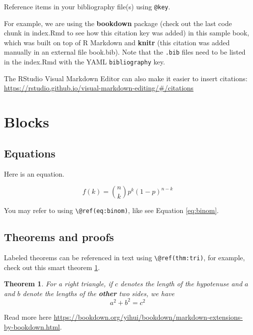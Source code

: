 \documentclass[
]{book}
\newtheorem{theorem}{Theorem}[chapter]
\theoremstyle{definition}
\theoremstyle{definition}
\theoremstyle{definition}
\theoremstyle{definition}
\theoremstyle{remark}
\begin{document}
Reference items in your bibliography file(s) using \texttt{@key}.

For example, we are using the \textbf{bookdown} package \citep{R-bookdown} (check out the last code chunk in index.Rmd to see how this citation key was added) in this sample book, which was built on top of R Markdown and \textbf{knitr} \citep{xie2015} (this citation was added manually in an external file book.bib).
Note that the \texttt{.bib} files need to be listed in the index.Rmd with the YAML \texttt{bibliography} key.

The RStudio Visual Markdown Editor can also make it easier to insert citations: \url{https://rstudio.github.io/visual-markdown-editing/\#/citations}

\hypertarget{blocks}{%
\section{Blocks}\label{blocks}}

\hypertarget{equations}{%
\subsection{Equations}\label{equations}}

Here is an equation.

\begin{equation} 
  f\left(k\right) = \binom{n}{k} p^k\left(1-p\right)^{n-k}
  \label{eq:binom}
\end{equation}

You may refer to using \texttt{\textbackslash{}@ref(eq:binom)}, like see Equation \eqref{eq:binom}.

\hypertarget{theorems-and-proofs}{%
\subsection{Theorems and proofs}\label{theorems-and-proofs}}

Labeled theorems can be referenced in text using \texttt{\textbackslash{}@ref(thm:tri)}, for example, check out this smart theorem \ref{thm:tri}.

\begin{theorem}
\protect\hypertarget{thm:tri}{}\label{thm:tri}For a right triangle, if \(c\) denotes the \emph{length} of the hypotenuse
and \(a\) and \(b\) denote the lengths of the \textbf{other} two sides, we have
\[a^2 + b^2 = c^2\]
\end{theorem}

Read more here \url{https://bookdown.org/yihui/bookdown/markdown-extensions-by-bookdown.html}.
\end{document}
